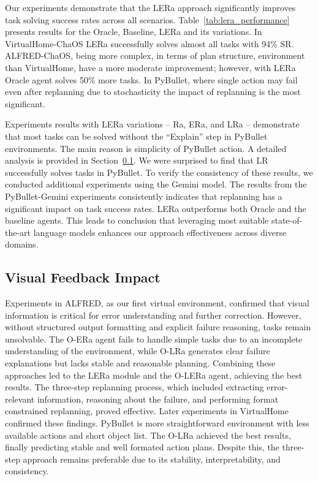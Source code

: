 \documentclass[letterpaper, 10 pt, conference]{ieeeconf}  %
\begin{document}
Our experiments demonstrate that the LERa approach significantly improves task solving success rates across all scenarios. 
Table~\ref{tab:lera_performance} presents results for the Oracle, Baseline, LERa and its variations. 
In VirtualHome-ChaOS LERa successfully solves almost all tasks with 94\% SR. ALFRED-ChaOS, being more complex, in terms of plan structure, environment than VirtualHome, have a more moderate improvement; however, with LERa Oracle agent solves 50\% more tasks. In PyBullet, where single action may fail even after replanning due to stochasticity the impact of replanning is the most significant. 

Experiments results with LERa variations -- Ra, ERa, and LRa -- demonstrate that most tasks can be solved without the ``Explain'' step in PyBullet environments. The main reason is simplicity of PyBullet action. A detailed analysis is provided in Section~\ref{results:visual-feedback}. We were surprised to find that LR successfully solves tasks in PyBullet. To verify the consistency of these results, we conducted additional experiments using the Gemini model.
The results from the PyBullet-Gemini experiments consistently indicates that replanning has a significant impact on task success rates. LERa outperforms both Oracle and the baseline agents. This leads to conclusion that leveraging most suitable state-of-the-art language models enhances our approach effectiveness across diverse domains.


\subsection{Visual Feedback Impact}
\label{results:visual-feedback}
Experiments in ALFRED, as our first virtual environment, confirmed that visual information is critical for error understanding and further correction. However, without structured output formatting and explicit failure reasoning, tasks remain unsolvable. The O-ERa agent fails to handle simple tasks due to an incomplete understanding of the environment, while O-LRa generates clear failure explanations but lacks stable and reasonable planning. Combining these approaches led to the LERa module and the O-LERa agent, achieving the best results. The three-step replanning process, which included extracting error-relevant information, reasoning about the failure, and performing format constrained replanning, proved effective. Later experiments in VirtualHome confirmed these findings. PyBullet is more straightforward environment with less available actions and short object list. The O-LRa achieved the best results, finally predicting stable and well formated action plans. Despite this, the three-step approach remains preferable due to its stability, interpretability, and consistency.
\end{document}
